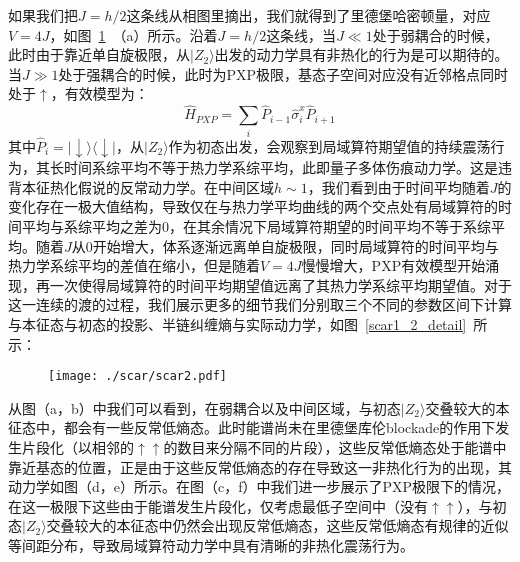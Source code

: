 如果我们把$J=h/2$这条线从相图里摘出，我们就得到了里德堡哈密顿量，对应$V=4J$，如图~\ref{scar1_2}~（a）所示。沿着$J=h/2$这条线，当$J\ll 1$处于弱耦合的时候，此时由于靠近单自旋极限，从$|Z_2\rangle$出发的动力学具有非热化的行为是可以期待的。当$J\gg 1$处于强耦合的时候，此时为PXP极限，基态子空间对应没有近邻格点同时处于$\uparrow$，有效模型为：
\begin{equation}
	\hat{H}_{PXP} = \sum_i\hat{P}_{i-1}\hat{\sigma}_{i}^x\hat{P}_{i+1}
\end{equation}
其中$\hat{P}_i=|\downarrow\rangle\langle\downarrow|$，从$|Z_2\rangle$作为初态出发，会观察到局域算符期望值的持续震荡行为，其长时间系综平均不等于热力学系综平均，此即量子多体伤痕动力学。这是违背本征热化假说的反常动力学。在中间区域$h\sim 1$，我们看到由于时间平均随着$J$的变化存在一极大值结构，导致仅在与热力学平均曲线的两个交点处有局域算符的时间平均与系综平均之差为0，在其余情况下局域算符期望的时间平均不等于系综平均。随着$J$从0开始增大，体系逐渐远离单自旋极限，同时局域算符的时间平均与热力学系综平均的差值在缩小，但是随着$V=4J$慢慢增大，PXP有效模型开始涌现，再一次使得局域算符的时间平均期望值远离了其热力学系综平均期望值。对于这一连续的渡的过程，我们展示更多的细节我们分别取三个不同的参数区间下计算与本征态与初态的投影、半链纠缠熵与实际动力学，如图~\ref{scar1_2_detail}~所示：
\begin{figure}[h]
\centering
\texttt{[image: ./scar/scar2.pdf]}
\label{scar1_2}
\end{figure}
从图（a，b）中我们可以看到，在弱耦合以及中间区域，与初态$|Z_2\rangle$交叠较大的本征态中，都会有一些反常低熵态。此时能谱尚未在里德堡库伦blockade的作用下发生片段化（以相邻的$\uparrow\uparrow$的数目来分隔不同的片段），这些反常低熵态处于能谱中靠近基态的位置，正是由于这些反常低熵态的存在导致这一非热化行为的出现，其动力学如图（d，e）所示。在图（c，f）中我们进一步展示了PXP极限下的情况，在这一极限下这些由于能谱发生片段化，仅考虑最低子空间中（没有$\uparrow\uparrow$），与初态$|Z_2\rangle$交叠较大的本征态中仍然会出现反常低熵态，这些反常低熵态有规律的近似等间距分布，导致局域算符动力学中具有清晰的非热化震荡行为。
